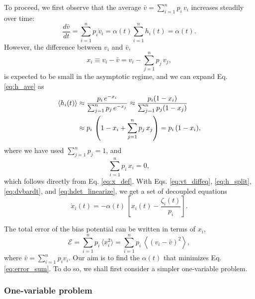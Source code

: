 \documentclass[reprint]{revtex4-1}
\begin{document}
To proceed, we first observe that
the average $\bar v = \sum_{i = 1}^n p_i \, v_i$
increases steadily over time:
%
\begin{equation}
\frac{ d \bar v } { d t }
=
\sum_{i = 1}^n p_i \dot v_i
=
\alpha(t) \sum_{i = 1}^n h_i(t) = \alpha(t).
\label{eq:dvbardt}
\end{equation}
%
However, the difference between $v_i$ and $\bar v$,
%
\begin{equation}
  x_i \equiv v_i - \bar v = v_i - \sum_{j = 1}^n p_j \, v_j,
  \label{eq:x_def}
\end{equation}
%
is expected to be small in the asymptotic regime,
and we can expand Eq. \eqref{eq:h_ave} as
\begin{align}
\langle h_i(t) \rangle
&\approx
\frac{ p_i \, e^{- x_i} }
{ \sum_{ j = 1}^n p_j \, e^{- x_j} }
\approx
\frac{ p_i ( 1 - x_i ) }
{ \sum_{ j = 1}^n p_j (1 - x_j) }
\notag \\
&\approx
p_i \, \left(
  1 - x_i + \sum_{j=1}^n p_j \, x_j
\right)
=
p_i \, (1 - x_i),
\label{eq:hdet_linearize}
\end{align}
where we have used $\sum_{j=1}^n p_j = 1$,
and
%
\begin{equation}
  \sum_{i = 1}^n p_i \, x_i = 0,
  \label{eq:px_sum}
\end{equation}
which follows directly from Eq. \eqref{eq:x_def}.
%
With Eqs.
\eqref{eq:vt_diffeq},
\eqref{eq:h_split},
\eqref{eq:dvbardt},
and
\eqref{eq:hdet_linearize},
we get a set of decoupled equations
%
\begin{equation}
  \dot x_i(t)
  =
  -\alpha(t) \, \left[ x_i(t) - \frac{ \zeta_i(t) } { p_i } \right].
  \label{eq:dxdt_WL}
\end{equation}



The total error of the bias potential can be written in
terms of $x_i$,
\begin{equation}
\mathcal E
=
\sum_{i = 1}^n p_i \, \langle x_i^2 \rangle
=
\sum_{i = 1}^n p_i \, \left\langle (v_i - \bar v)^2 \right\rangle,
\label{eq:error_sum}
\end{equation}
where
$\bar v = \sum_{i = 1}^n p_i v_i$.
%
Our aim is to find the $\alpha(t)$
that minimizes Eq. \eqref{eq:error_sum}.
%
To do so, we shall first consider
a simpler one-variable problem.



\subsubsection{One-variable problem}
\end{document}
